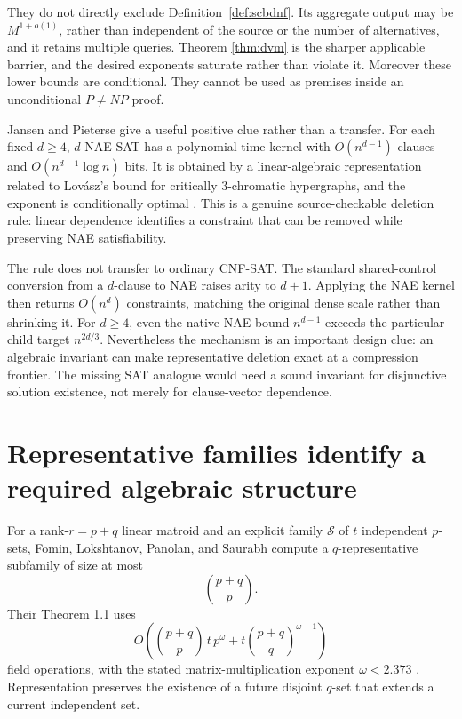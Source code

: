 \documentclass[11pt]{article}
\begin{document}
They do not directly exclude Definition~\ref{def:scbdnf}.  Its aggregate
output may be $M^{1+o(1)}$, rather than independent of the source or the
number of alternatives, and it retains multiple queries.  Theorem
\ref{thm:dvm} is the sharper applicable barrier, and the desired exponents
saturate rather than violate it.  Moreover these lower bounds are
conditional.  They cannot be used as premises inside an unconditional
$P\ne NP$ proof.

Jansen and Pieterse give a useful positive clue rather than a transfer.
For each fixed $d\ge4$, $d$-NAE-SAT has a polynomial-time kernel with
$O(n^{d-1})$ clauses and $O(n^{d-1}\log n)$ bits.  It is obtained by a
linear-algebraic representation related to Lov\'asz's bound for critically
$3$-chromatic hypergraphs, and the exponent is conditionally optimal
\cite{jansenpieterse2017}.  This is a genuine source-checkable deletion rule:
linear dependence identifies a constraint that can be removed while
preserving NAE satisfiability.

The rule does not transfer to ordinary CNF-SAT.  The standard shared-control
conversion from a $d$-clause to NAE raises arity to $d+1$.  Applying the NAE
kernel then returns $O(n^d)$ constraints, matching the original dense scale
rather than shrinking it.  For $d\ge4$, even the native NAE bound
$n^{d-1}$ exceeds the particular child target $n^{2d/3}$.  Nevertheless the
mechanism is an important design clue: an algebraic invariant can make
representative deletion exact at a compression frontier.  The missing SAT
analogue would need a sound invariant for disjunctive solution existence,
not merely for clause-vector dependence.

\section{Representative families identify a required algebraic structure}

For a rank-$r=p+q$ linear matroid and an explicit family $\mathcal S$ of
$t$ independent $p$-sets, Fomin, Lokshtanov, Panolan, and Saurabh compute a
$q$-representative subfamily of size at most
\[
 \binom{p+q}{p}. \tag{11}
\]
Their Theorem 1.1 uses
\begin{equation}
 O\!\left(\binom{p+q}{p}\,t\,p^\omega
   +t\binom{p+q}{q}^{\omega-1}\right) \tag{12}
\end{equation}
field operations, with the stated matrix-multiplication exponent
$\omega<2.373$ \cite{fominrepresentative2016}.  Representation preserves the
existence of a future disjoint $q$-set that extends a current independent
set.
\end{document}
